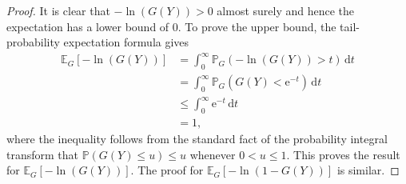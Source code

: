 \documentclass[10pt]{article} %
\theoremstyle{theorem}
\theoremstyle{definition}
\newcommand{\EEE}{\mathbb{E}}
\newcommand{\PPP}{\mathbb{P}}
\newcommand{\dd}{\mathrm{d}}
\begin{document}
\begin{proof}
It is clear that $-\ln(G(Y))> 0$ almost surely and hence the expectation has a lower bound of $0$. To prove the upper bound, the tail-probability expectation formula gives
\begin{align*}
\EEE_G[-\ln(G(Y))]
&= \int_0^\infty \PPP_G(-\ln(G(Y)) > t) \,\dd t \\
&= \int_0^\infty \PPP_G(G(Y) < \mathrm{e}^{-t}) \,\dd t \\
&\leq \int_0^\infty \mathrm{e}^{-t} \,\dd t \\
&=1,
\end{align*}
where the inequality follows from the standard fact of the probability integral transform that $\PPP(G(Y)\leq u)\leq u$ whenever $0<u\leq 1$. This proves the result for $\EEE_G[-\ln(G(Y))]$. The proof for $\EEE_G[-\ln(1-G(Y))]$ is similar.
\end{proof}
\end{document}
